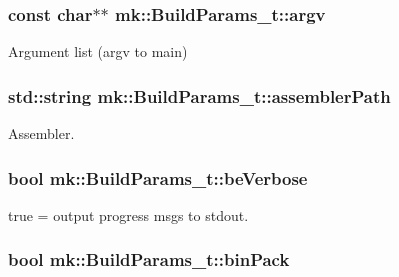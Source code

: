 \subsubsection[{\texorpdfstring{argv}{argv}}]{\setlength{\rightskip}{0pt plus 5cm}const char$\ast$$\ast$ mk\+::\+Build\+Params\+\_\+t\+::argv}\hypertarget{structmk_1_1_build_params__t_ab24c737327bc8f3e4ea465894071444d}{}\label{structmk_1_1_build_params__t_ab24c737327bc8f3e4ea465894071444d}


Argument list (argv to main) 

\subsubsection[{\texorpdfstring{assembler\+Path}{assemblerPath}}]{\setlength{\rightskip}{0pt plus 5cm}std\+::string mk\+::\+Build\+Params\+\_\+t\+::assembler\+Path}\hypertarget{structmk_1_1_build_params__t_a93732a76fa05d90f7749273eb200f67c}{}\label{structmk_1_1_build_params__t_a93732a76fa05d90f7749273eb200f67c}


Assembler. 

\subsubsection[{\texorpdfstring{be\+Verbose}{beVerbose}}]{\setlength{\rightskip}{0pt plus 5cm}bool mk\+::\+Build\+Params\+\_\+t\+::be\+Verbose}\hypertarget{structmk_1_1_build_params__t_a553f6de2c0dbc2d6123294c454835c5c}{}\label{structmk_1_1_build_params__t_a553f6de2c0dbc2d6123294c454835c5c}


true = output progress msgs to stdout. 

\subsubsection[{\texorpdfstring{bin\+Pack}{binPack}}]{\setlength{\rightskip}{0pt plus 5cm}bool mk\+::\+Build\+Params\+\_\+t\+::bin\+Pack}\hypertarget{structmk_1_1_build_params__t_ab0314a32f1aa7ee1d49b0fd3de3e5b33}{}\label{structmk_1_1_build_params__t_ab0314a32f1aa7ee1d49b0fd3de3e5b33}


